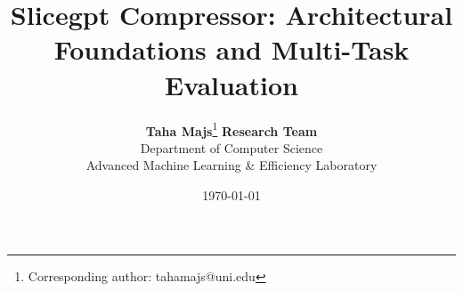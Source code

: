 \title{\textbf{Slicegpt Compressor: Architectural Foundations and Multi-Task Evaluation}}

\author{
  \textbf{Taha Majs}\thanks{Corresponding author: tahamajs@uni.edu} \quad \textbf{Research Team} \\
  Department of Computer Science \\
  Advanced Machine Learning \& Efficiency Laboratory
}

\date{\today}

